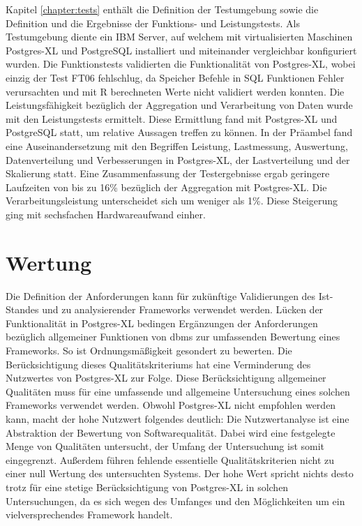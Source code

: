 Kapitel \ref{chapter:tests} enthält die Definition der Testumgebung sowie die Definition und die Ergebnisse der Funktions- und Leistungstests.
Als Testumgebung diente ein IBM Server, auf welchem mit virtualisierten Maschinen Postgres-XL und PostgreSQL installiert und miteinander vergleichbar konfiguriert wurden.
Die Funktionstests validierten die Funktionalität von Postgres-XL, wobei einzig der Test FT06 fehlschlug, da Speicher Befehle in SQL Funktionen Fehler verursachten und mit R berechneten Werte nicht validiert werden konnten.
Die Leistungsfähigkeit bezüglich der Aggregation und Verarbeitung von Daten wurde mit den Leistungstests ermittelt.
Diese Ermittlung fand mit Postgres-XL und PostgreSQL statt, um relative Aussagen treffen zu können.
In der Präambel fand eine Auseinandersetzung mit den Begriffen Leistung, Lastmessung, Auswertung, Datenverteilung und Verbesserungen in Postgres-XL, der Lastverteilung und der Skalierung statt.
Eine Zusammenfassung der Testergebnisse ergab geringere Laufzeiten von bis zu 16\%{} bezüglich der Aggregation mit Postgres-XL.
Die Verarbeitungsleistung unterscheidet sich um weniger als 1\%{}.
Diese Steigerung ging mit sechsfachen Hardwareaufwand einher.

\section{Wertung}

Die Definition der Anforderungen kann für zukünftige Validierungen des Ist-Standes und zu analysierender Frameworks verwendet werden.
Lücken der Funktionalität in Postgres-XL bedingen Ergänzungen der Anforderungen bezüglich allgemeiner Funktionen von \Gls{dbms} zur umfassenden Bewertung eines Frameworks.
So ist Ordnungsmäßigkeit gesondert zu bewerten.
Die Berücksichtigung dieses Qualitätskriteriums hat eine Verminderung des Nutzwertes von Postgres-XL zur Folge.
Diese Berücksichtigung allgemeiner Qualitäten muss für eine umfassende und allgemeine Untersuchung eines solchen Frameworks verwendet werden.
Obwohl Postgres-XL nicht empfohlen werden kann, macht der hohe Nutzwert folgendes deutlich: 
Die Nutzwertanalyse ist eine Abstraktion der Bewertung von Softwarequalität.
Dabei wird eine festgelegte Menge von Qualitäten untersucht, der Umfang der Untersuchung ist somit eingegrenzt.
Außerdem führen fehlende essentielle Qualitätskriterien nicht zu einer null Wertung des untersuchten Systems.
Der hohe Wert spricht nichts desto trotz für eine stetige Berücksichtigung von Postgres-XL in solchen Untersuchungen, da es sich wegen des Umfanges und den Möglichkeiten um ein vielversprechendes Framework handelt.

